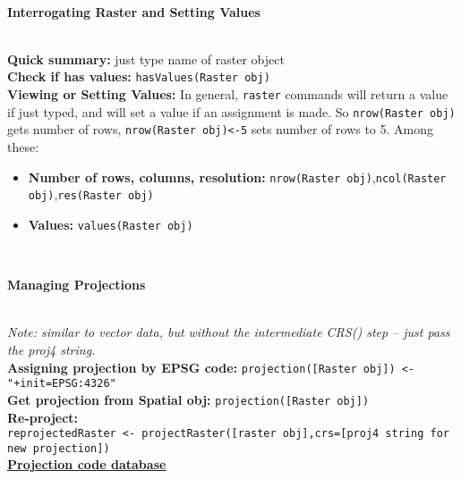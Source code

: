 \documentclass[10pt]{article}
\begin{document}

\hrulefill \\ 
\centerline{\textbf{Interrogating Raster and Setting Values}} \\
\textbf{Quick summary:} just type name of raster object \\
\textbf{Check if has values:} \texttt{hasValues(Raster obj)}\\

\textbf{Viewing or Setting Values:} In general, \texttt{raster} commands will return a value if just typed, and will set a value if an assignment is made. So \texttt{nrow(Raster obj)} gets number of rows, \texttt{nrow(Raster obj)<-5} sets number of rows to 5. Among these:
\begin{itemize}
	\item \textbf{Number of rows, columns, resolution:} \texttt{nrow(Raster obj)},\texttt{ncol(Raster obj)},\texttt{res(Raster obj)}
	\item \textbf{Values:} \texttt{values(Raster obj)}\\
\end{itemize}


\hrulefill \\ 
\centerline{\textbf{Managing Projections}} \\
\emph{Note: similar to vector data, but without the intermediate CRS() step -- just pass the proj4 string.}\\
\textbf{Assigning projection by EPSG code:} \texttt{projection([Raster obj]) <-"+init=EPSG:4326"}\\
\textbf{Get projection from Spatial obj:} \texttt{projection([Raster obj])} \\
\textbf{Re-project:} \\
\hspace*{0.3cm}\texttt{reprojectedRaster <- projectRaster([raster obj],crs=[proj4 string for new projection])}\\
\href{http://www.spatialreference.org/}{\underline{\textbf{Projection code database}}} \\
\end{document}
